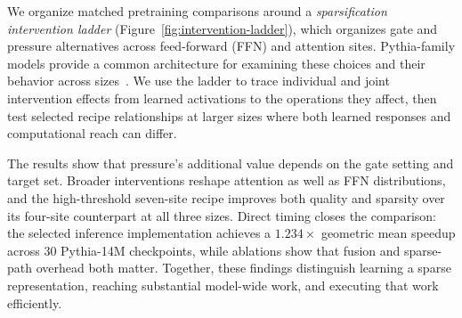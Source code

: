 We organize matched pretraining comparisons around a \emph{sparsification
intervention ladder} (Figure~\ref{fig:intervention-ladder}), which organizes gate
and pressure alternatives across feed-forward (FFN) and attention sites. Pythia-family
models provide a common architecture for examining these choices and their
behavior across sizes~\citep{biderman2023pythia}. We use the ladder to trace
individual and joint intervention effects from learned activations to the
operations they affect, then test selected recipe relationships at larger
sizes where both learned responses and computational reach can differ.

The results show that pressure's additional value depends on the gate
setting and target set. Broader interventions reshape attention as well as
FFN distributions, and the high-threshold seven-site recipe improves both
quality and sparsity over its four-site counterpart at all three sizes.
Direct timing closes the comparison: the selected inference implementation
achieves a $1.234\times$ geometric mean speedup across 30 Pythia-14M
checkpoints, while ablations show that fusion and sparse-path overhead both
matter. Together, these findings distinguish learning a sparse representation,
reaching substantial model-wide work, and executing that work efficiently.

